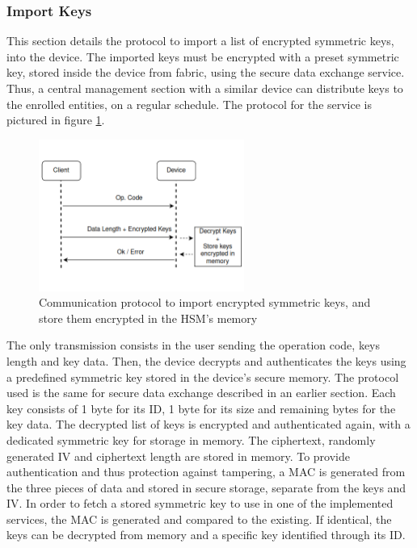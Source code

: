 \subsubsection{Import Keys}\label{chap:arch:services:new-comms:import}

This section details the protocol to import a list of encrypted symmetric keys, into the device.
The imported keys must be encrypted with a preset symmetric key, stored inside the device from fabric, using the secure data exchange service. Thus, a central management section with a similar device can distribute keys to the enrolled entities, on a regular schedule.
The protocol for the service is pictured in figure \ref{fig:protocol:import-keys}.

\begin{figure}[h!]
	\centering
	\includegraphics[width=0.60\textwidth]{./Images/import-keys.png}
	\caption{Communication protocol to import encrypted symmetric keys, and store them encrypted in the HSM's memory}
	\label{fig:protocol:import-keys}
\end{figure}

The only transmission consists in the user sending the operation code, keys length and key data. Then, the device decrypts and authenticates the keys using a predefined symmetric key stored in the device's secure memory. The protocol used is the same for secure data exchange described in an earlier section.
Each key consists of 1 byte for its ID, 1 byte for its size and remaining bytes for the key data.
The decrypted list of keys is encrypted and authenticated again, with a dedicated symmetric key for storage in memory. The ciphertext, randomly generated IV and ciphertext length are stored in memory. To provide authentication and thus protection against tampering, a \ac{MAC} is generated from the three pieces of data and stored in secure storage, separate from the keys and IV.
In order to fetch a stored symmetric key to use in one of the implemented services, the \ac{MAC} is generated and compared to the existing. If identical, the keys can be decrypted from memory and a specific key identified through its ID.

